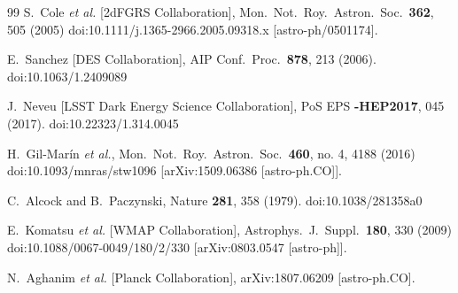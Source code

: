 \documentclass[floatfix,aps,amsmath,nofootinbib,onecolumn,10pt]{revtex4}
\begin{document}
\begin{thebibliography}{99}
  S.~Cole {\it et al.} [2dFGRS Collaboration],
  Mon.\ Not.\ Roy.\ Astron.\ Soc.\  {\bf 362}, 505 (2005)
  doi:10.1111/j.1365-2966.2005.09318.x
  [astro-ph/0501174].
    
  E.~Sanchez [DES Collaboration],
  AIP Conf.\ Proc.\  {\bf 878}, 213 (2006).
  doi:10.1063/1.2409089
  
  J.~Neveu [LSST Dark Energy Science Collaboration],
  PoS EPS {\bf -HEP2017}, 045 (2017).
  doi:10.22323/1.314.0045
  
  H.~Gil-Marín {\it et al.},
  Mon.\ Not.\ Roy.\ Astron.\ Soc.\  {\bf 460}, no. 4, 4188 (2016)
  doi:10.1093/mnras/stw1096
  [arXiv:1509.06386 [astro-ph.CO]].
  
  C.~Alcock and B.~Paczynski,
  Nature {\bf 281}, 358 (1979).
  doi:10.1038/281358a0
   
  E.~Komatsu {\it et al.} [WMAP Collaboration],
  Astrophys.\ J.\ Suppl.\  {\bf 180}, 330 (2009)
  doi:10.1088/0067-0049/180/2/330
  [arXiv:0803.0547 [astro-ph]].
  
  N.~Aghanim {\it et al.} [Planck Collaboration],
  arXiv:1807.06209 [astro-ph.CO].
 

\end{thebibliography}
\end{document}
